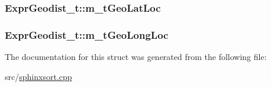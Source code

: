 \hypertarget{structExprGeodist__t_a8c95879b79675607d6f47725d3835d91}{
\subsubsection[{m\-\_\-t\-Geo\-Lat\-Loc}]{ Expr\-Geodist\-\_\-t\-::m\-\_\-t\-Geo\-Lat\-Loc\hspace{0.3cm}{\ttfamily [protected]}}}\label{structExprGeodist__t_a8c95879b79675607d6f47725d3835d91}
\hypertarget{structExprGeodist__t_ae5a5bfc0a235ce4bb66ba57d229ec36e}{
\subsubsection[{m\-\_\-t\-Geo\-Long\-Loc}]{ Expr\-Geodist\-\_\-t\-::m\-\_\-t\-Geo\-Long\-Loc\hspace{0.3cm}{\ttfamily [protected]}}}\label{structExprGeodist__t_ae5a5bfc0a235ce4bb66ba57d229ec36e}


The documentation for this struct was generated from the following file\-:\begin{DoxyCompactItemize}
\item 
src/\hyperlink{sphinxsort_8cpp}{sphinxsort.\-cpp}\end{DoxyCompactItemize}
